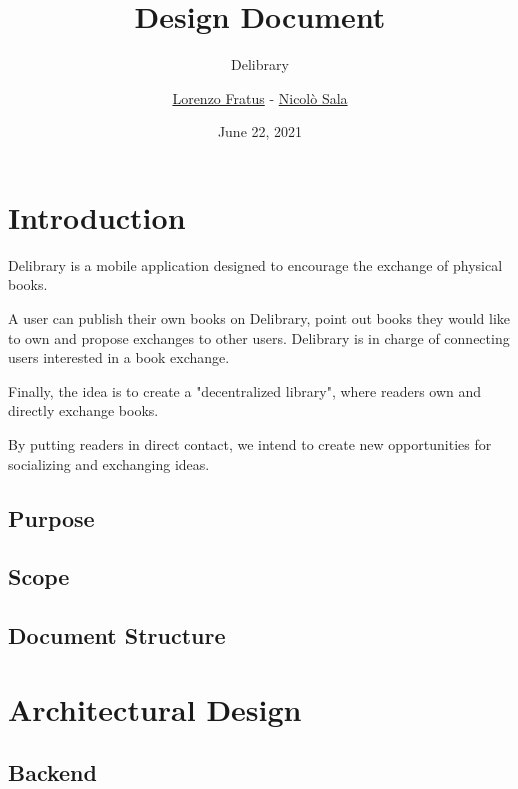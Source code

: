 
\graphicspath{ {assets/} }

\title{Design Document}
\subtitle{Delibrary}
\author{\href{https://github.com/lorenzofratus}{Lorenzo Fratus} - \href{https://github.com/nicheosala}{Nicolò Sala}}
\date{June 22, 2021}



\maketitle

\tableofcontents



\chapter{Introduction}

Delibrary is a mobile application designed to encourage the exchange of physical books.

A user can publish their own books on Delibrary, point out books they would like to own and propose exchanges to other users.
Delibrary is in charge of connecting users interested in a book exchange.

Finally, the idea is to create a "decentralized library", where readers own and directly exchange books.

By putting readers in direct contact, we intend to create new opportunities for socializing and exchanging ideas.

\section{Purpose}

\section{Scope}

\section{Document Structure}



\chapter{Architectural Design}

\section{Backend}

